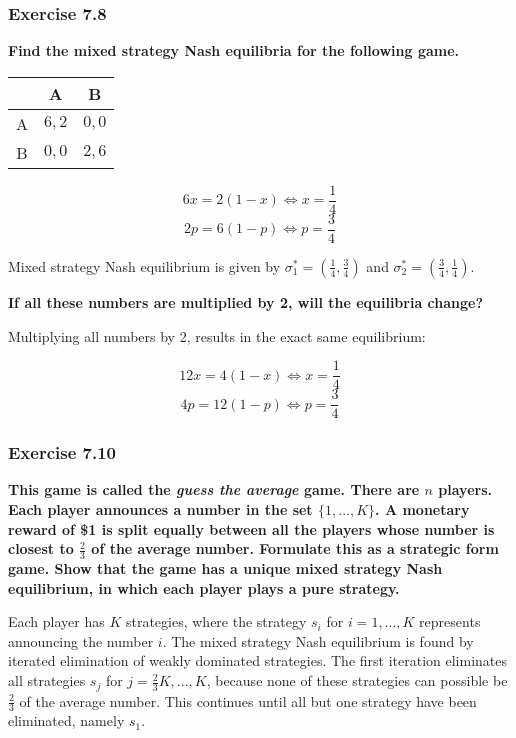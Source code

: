 \documentclass[12pt, a4paper]{article}
\begin{document}
\subsubsection*{Exercise 7.8}

\textbf{Find the mixed strategy Nash equilibria for the following game.}

\begin{table}[ht!]
    \centering
    \begin{tabular}{|c|c|c|} \hline
          & A     & B     \\ \hline
        A & $6,2$ & $0,0$ \\ \hline
        B & $0,0$ & $2,6$ \\ \hline
    \end{tabular}
\end{table}

\[ 6x = 2(1-x) \Leftrightarrow x = \frac{1}{4} \]
\[ 2p = 6(1-p) \Leftrightarrow p = \frac{3}{4} \]

Mixed strategy Nash equilibrium is given by $\sigma_1^* = \left(\frac{1}{4}, \frac{3}{4}\right)$ and $\sigma_2^* = \left(\frac{3}{4}, \frac{1}{4}\right)$.

\textbf{If all these numbers are multiplied by 2, will the equilibria change?}

Multiplying all numbers by 2, results in the exact same equilibrium:

\[ 12x = 4(1-x) \Leftrightarrow x = \frac{1}{4} \]
\[ 4p = 12(1-p) \Leftrightarrow p = \frac{3}{4} \]


\subsubsection*{Exercise 7.10}

\textbf{This game is called the \emph{guess the average} game. There are $n$ players. Each player announces a number in the set $\{1, ..., K\}$. A monetary reward of \$1 is split equally between all the players whose number is closest to $\frac{2}{3}$ of the average number. Formulate this as a strategic form game. Show that the game has a unique mixed strategy Nash equilibrium, in which each player plays a pure strategy.}

Each player has $K$ strategies, where the strategy $s_i$ for $i=1, ..., K$ represents announcing the number $i$. The mixed strategy Nash equilibrium is found by iterated elimination of weakly dominated strategies. The first iteration eliminates all strategies $s_j$ for $j = \frac{2}{3}K, ..., K$, because none of these strategies can possible be $\frac{2}{3}$ of the average number. This continues until all but one strategy have been eliminated, namely $s_1$.
\end{document}
